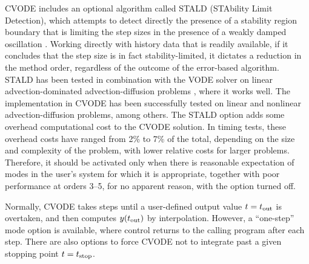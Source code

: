 CVODE includes an optional algorithm called STALD (STAbility Limit
Detection), which attempts to detect directly the presence of a
stability region boundary that is limiting the step sizes in the
presence of a weakly damped oscillation \cite{Hin:92}.  Working
directly with history data that is readily available, if it concludes
that the step size is in fact stability-limited, it dictates a
reduction in the method order, regardless of the outcome of the
error-based algorithm.  STALD has been tested in combination with the
VODE solver on linear advection-dominated advection-diffusion problems
\cite{Hin:95}, where it works well.  The implementation in CVODE has
been successfully tested on linear and nonlinear advection-diffusion
problems, among others.
The STALD option adds some overhead computational cost to the CVODE
solution.  In timing tests, these overhead costs have ranged from 2\%
to 7\% of the total, depending on the size and complexity of the
problem, with lower relative costs for larger problems.  Therefore, it
should be activated only when there is reasonable expectation of modes
in the user's system for which it is appropriate, together with poor
performance at orders 3--5, for no apparent reason, with the option
turned off.

Normally, CVODE takes steps until a user-defined output value 
$t = t_{\mbox{\scriptsize out}}$ is overtaken, and then computes
$y(t_{\mbox{\scriptsize out}})$ by interpolation.  However, a
``one-step'' mode option is available, where control returns to the
calling program after each step.  There are also options to force
CVODE not to integrate past a given stopping point 
$t = t_{\mbox{\scriptsize stop}}$.
